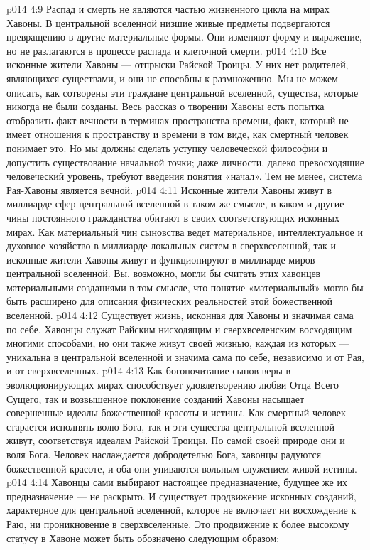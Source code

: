 \vs p014 4:9 \pc Распад и смерть не являются частью жизненного цикла на мирах Хавоны. В центральной вселенной низшие живые предметы подвергаются превращению в другие материальные формы. Они изменяют форму и выражение, но не разлагаются в процессе распада и клеточной смерти.
\vs p014 4:10 \pc Все исконные жители Хавоны --- отпрыски Райской Троицы. У них нет родителей, являющихся существами, и они не способны к размножению. Мы не можем описать, как сотворены эти граждане центральной вселенной, существа, которые никогда не были созданы. Весь рассказ о творении Хавоны есть попытка отобразить факт вечности в терминах пространства\hyp{}времени, факт, который не имеет отношения к пространству и времени в том виде, как смертный человек понимает это. Но мы должны сделать уступку человеческой философии и допустить существование начальной точки; даже личности, далеко превосходящие человеческий уровень, требуют введения понятия «начал». Тем не менее, система Рая\hyp{}Хавоны является вечной.
\vs p014 4:11 Исконные жители Хавоны живут в миллиарде сфер центральной вселенной в таком же смысле, в каком и другие чины постоянного гражданства обитают в своих соответствующих исконных мирах. Как материальный чин сыновства ведет материальное, интеллектуальное и духовное хозяйство в миллиарде локальных систем в сверхвселенной, так и исконные жители Хавоны живут и функционируют в миллиарде миров центральной вселенной. Вы, возможно, могли бы считать этих хавонцев материальными созданиями в том смысле, что понятие «материальный» могло бы быть расширено для описания физических реальностей этой божественной вселенной.
\vs p014 4:12 Существует жизнь, исконная для Хавоны и значимая сама по себе. Хавонцы служат Райским нисходящим и сверхвселенским восходящим многими способами, но они также живут своей жизнью, каждая из которых --- уникальна в центральной вселенной и значима сама по себе, независимо и от Рая, и от сверхвселенных.
\vs p014 4:13 Как богопочитание сынов веры в эволюционирующих мирах способствует удовлетворению любви Отца Всего Сущего, так и возвышенное поклонение созданий Хавоны насыщает совершенные идеалы божественной красоты и истины. Как смертный человек старается исполнять волю Бога, так и эти существа центральной вселенной живут, соответствуя идеалам Райской Троицы. По самой своей природе они и  воля Бога. Человек наслаждается добродетелью Бога, хавонцы радуются божественной красоте, и оба они упиваются вольным служением живой истины.
\vs p014 4:14 Хавонцы сами выбирают настоящее предназначение, будущее же их предназначение --- не раскрыто. И существует продвижение исконных созданий, характерное для центральной вселенной, которое не включает ни восхождение к Раю, ни проникновение в сверхвселенные. Это продвижение к более высокому статусу в Хавоне может быть обозначено следующим образом:
